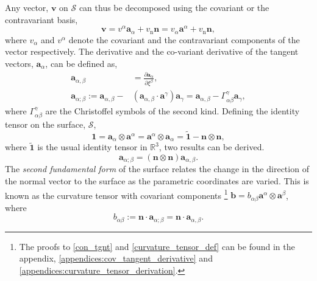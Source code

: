 Any vector, $\boldsymbol{v}$ on $\mathcal{S}$ can thus be decomposed using the covariant or the contravariant basis,
\begin{equation}
    \boldsymbol{v} = v^{\alpha} \boldsymbol{a}_{\alpha} + v_{\mathrm{n}}\boldsymbol{n} = v_{\alpha} \boldsymbol{a}^{\alpha} + v_{\mathrm{n}}\boldsymbol{n},
\end{equation}
 where $v_{\alpha}$ and $v^{\alpha}$ denote the covariant and the contravariant components of the vector respectively.
The derivative and the co-variant derivative of the tangent vectors, $\boldsymbol{a}_{\alpha}$, can be defined as,
\begin{align}\label{tangent_derivatives}
    \boldsymbol{a}_{\alpha , \beta} &= \frac{\partial \boldsymbol{a}_{\alpha}}{\partial \xi^{\beta}},\\
    \boldsymbol{a}_{\alpha ; \beta} := \boldsymbol{a}_{\alpha , \beta} - &(\boldsymbol{a}_{\alpha , \beta} \cdot \boldsymbol{a}^{\gamma}) \boldsymbol{a}_{\gamma} = \boldsymbol{a}_{\alpha , \beta} - \Gamma^{\gamma}_{\alpha \beta} \boldsymbol{a}_{\gamma},
\end{align}
where $\Gamma^{\gamma}_{\alpha \beta}$ are the Christoffel symbols of the second kind.
Defining the identity tensor on the surface, $\mathcal{S}$,
\begin{equation}\label{surface_identity}
    \boldsymbol{1} = \boldsymbol{a}_{\alpha} \otimes \boldsymbol{a}^{\alpha} = \boldsymbol{a}^{\alpha} \otimes \boldsymbol{a}_{\alpha} = \boldsymbol{\tilde{1}} - \boldsymbol{n} \otimes \boldsymbol{n}, 
\end{equation}
where $\boldsymbol{\tilde{1}}$ is the usual identity tensor in $\mathbb{R}^{3}$, two results can be derived.
\begin{equation}\label{con_tgnt}
    \boldsymbol{a}_{\alpha ; \beta} = (\boldsymbol{n} \otimes \boldsymbol{n}) \boldsymbol{a}_{\alpha,\beta}.
\end{equation}
The \emph{second fundamental form} of the surface relates the change in the direction of the normal vector to the surface as the parametric coordinates are varied.
This is known as the curvature tensor with covariant components \footnote{The proofs to \eqref{con_tgnt} and \eqref{curvature_tensor_def} can be found in the appendix, \eqref{appendices:cov_tangent_derivative} and \eqref{appendices:curvature_tensor_derivation}.}
 $\boldsymbol{b} = b_{\alpha \beta} \boldsymbol{a}^{\alpha} \otimes \boldsymbol{a}^{\beta}$, where
\begin{equation} \label{curvature_tensor_def}
    b_{\alpha \beta} := \boldsymbol{n} \cdot \boldsymbol{a}_{\alpha ; \beta} = \boldsymbol{n} \cdot \boldsymbol{a}_{\alpha,\beta}.
\end{equation}
